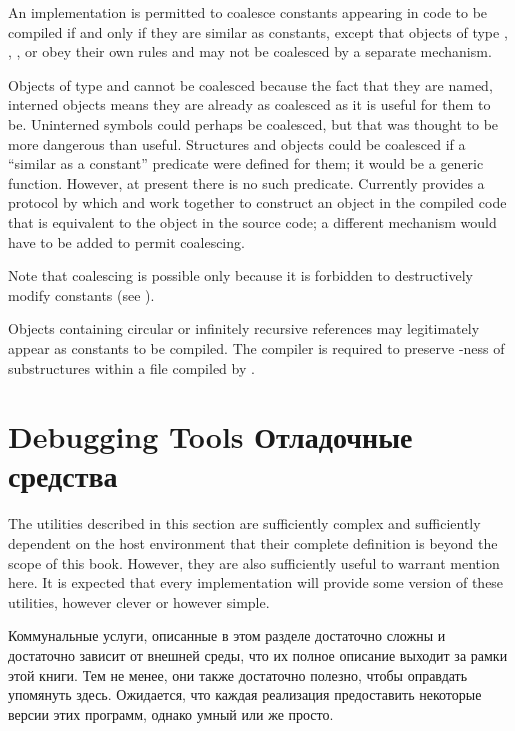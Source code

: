 An implementation is permitted to coalesce constants
appearing in code to be compiled if and only if they are similar as
constants, except that objects of type , ,
, or  obey their own rules
and may not be coalesced by a separate mechanism.

\beforenoterule
\begin{rationale}
Objects of type  and  cannot be coalesced because the fact
that they are named, interned objects means they are already as
coalesced as it is useful for them to be.  Uninterned symbols could
perhaps be coalesced, but that was thought to be more dangerous than
useful.  Structures and objects could be
coalesced if a ``similar as a constant'' predicate were defined for them;
it would be a generic function.  However, at present there is no such
predicate.  Currently  provides a protocol by which
 and  work together to construct an object in the
compiled code that is equivalent to the object in the source code;
a different mechanism would have to be added to permit coalescing.
\end{rationale}
\afternoterule

Note that coalescing is possible only because it is forbidden to
destructively modify constants  (see ).

Objects containing circular or infinitely recursive references may legitimately
appear as constants to be compiled.  The compiler is
required to preserve -ness of substructures within a file compiled
by .

\section{Debugging Tools Отладочные средства}

The utilities described in this section are sufficiently complex
and sufficiently dependent on the host environment that their
complete definition is beyond the scope of this book.
However, they are also sufficiently
useful to warrant mention here.  It is expected that
every implementation will
provide some version of these utilities, however clever or however simple.

Коммунальные услуги, описанные в этом разделе достаточно сложны
и достаточно зависит от внешней среды, что их
полное описание выходит за рамки этой книги.
Тем не менее, они также достаточно
полезно, чтобы оправдать упомянуть здесь. Ожидается, что
каждая реализация
предоставить некоторые версии этих программ, однако умный или же просто.

